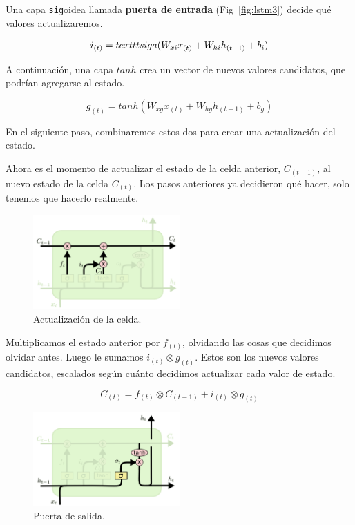 \documentclass[a4paper,12pt]{article}
\begin{document}
Una capa \texttt{sig}oidea llamada \textbf{puerta de entrada} (Fig~\ref{fig:lstm3}) decide qué valores actualizaremos.

$$i_{(t)}=\\texttt{sig}a(W_{xi}x_{(t)} + W_{hi}h_{(t-1)} + b_i)$$

A continuación, una capa $tanh$ crea un vector de nuevos valores candidatos, que podrían agregarse al estado. 

$$g_{(t)}=tanh(W_{xg}x_{(t)}+W_{hg}h_{(t-1)}+b_g)$$


En el siguiente paso, combinaremos estos dos para crear una actualización del estado.

Ahora es el momento de actualizar el estado de la celda anterior, $C_{(t-1)}$, al nuevo estado de la celda $C_{(t)}$. Los pasos anteriores ya decidieron qué hacer, solo tenemos que hacerlo realmente.

\begin{figure}[H]
	\begin{center}				
	\includegraphics[width=0.5\textwidth]{lstm4.png}
  	\caption{Actualización de la celda.}
  	\label{fig:lstm4}
  	\end{center}
\end{figure}

Multiplicamos el estado anterior por $f_{(t)}$, olvidando las cosas que decidimos olvidar antes. Luego le sumamos $i_{(t)} \otimes g_{(t)}$. Estos son los nuevos valores candidatos, escalados según cuánto decidimos actualizar cada valor de estado.

$$C_{(t)} = f_{(t)} \otimes C_{(t-1)} + i_{(t)} \otimes g_{(t)}$$

\begin{figure}[H]
	\begin{center}				
	\includegraphics[width=0.5\textwidth]{lstm5.png}
  	\caption{Puerta de salida.}
  	\label{fig:lstm5}
  	\end{center}
\end{figure}
\end{document}
